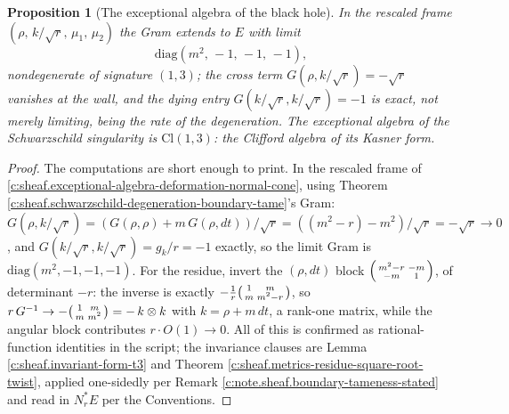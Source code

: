 \documentclass[11pt]{article}
\newtheorem{proposition}[theorem]{Proposition}
\theoremstyle{definition}
\theoremstyle{plain}
\newcommand{\changedmark}[2]{\marginpar{\raggedright\scriptsize\color{#1}#2}}
\providecommand{\Cl}{}\renewcommand{\Cl}{\mathrm{Cl}}
\providecommand{\dtPG}{}\renewcommand{\dtPG}{dt}
\begin{document}
\begin{proposition}[The exceptional algebra of the black hole]\label{c:sheaf.exceptional-algebra-black-hole}
\changedmark{BurntOrange}{changed since the deposit}
In the rescaled frame $(\rho,\, k/\sqrt{r},\, \mu_1,\, \mu_2)$ the Gram extends to $E$ with limit
\[
\mathrm{diag}(m^2,\, -1,\, -1,\, -1),
\]
nondegenerate of signature $(1,3)$; the cross term $G(\rho, k/\sqrt{r}) = -\sqrt{r}$ vanishes at the wall, and the dying entry $G(k/\sqrt r, k/\sqrt r) = -1$ is \emph{exact}, not merely limiting, being the rate of the degeneration. The exceptional algebra of the Schwarzschild singularity is $\Cl(1,3)$: the Clifford algebra of its Kasner form.
\end{proposition}
\begin{proof}
The computations are short enough to print. In the rescaled frame of \ref{c:sheaf.exceptional-algebra-deformation-normal-cone}, using Theorem \ref{c:sheaf.schwarzschild-degeneration-boundary-tame}'s Gram: $G(\rho, k/\sqrt r) = (G(\rho,\rho) + m\,G(\rho,\dtPG))/\sqrt r = ((m^2 - r) - m^2)/\sqrt r = -\sqrt r \to 0$, and $G(k/\sqrt r, k/\sqrt r) = g_k/r = -1$ exactly, so the limit Gram is $\mathrm{diag}(m^2, -1, -1, -1)$. For the residue, invert the $(\rho, \dtPG)$ block $\begin{psmallmatrix} m^2 - r & -m \\ -m & 1 \end{psmallmatrix}$, of determinant $-r$: the inverse is exactly $-\tfrac1r \begin{psmallmatrix} 1 & m \\ m & m^2 - r \end{psmallmatrix}$, so $r\,G^{-1} \to -\begin{psmallmatrix} 1 & m \\ m & m^2 \end{psmallmatrix} = -\,k \otimes k$ with $k = \rho + m\,\dtPG$, a rank-one matrix, while the angular block contributes $r \cdot O(1) \to 0$. All of this is confirmed as rational-function identities in the script; the invariance clauses are Lemma \ref{c:sheaf.invariant-form-t3} and Theorem \ref{c:sheaf.metrics-residue-square-root-twist}, applied one-sidedly per Remark \ref{c:note.sheaf.boundary-tameness-stated} and read in $N^*_rE$ per the Conventions.

\end{proof}
\end{document}
